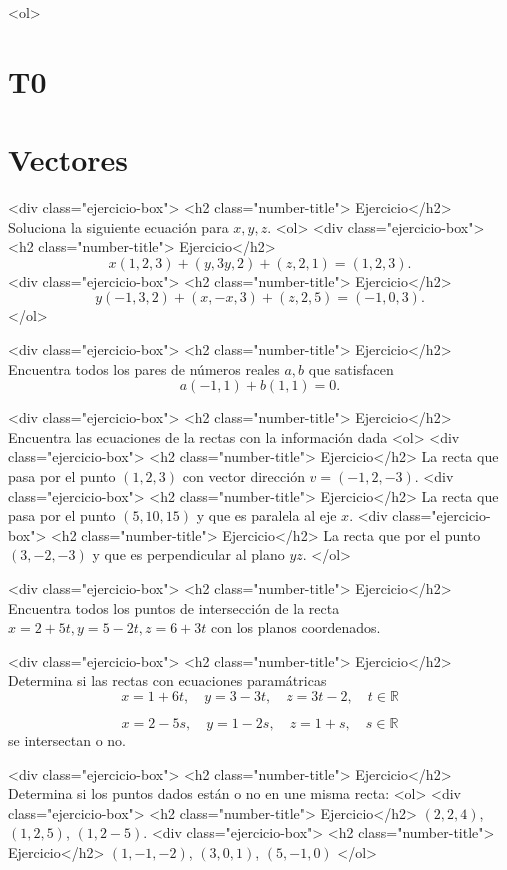 \documentclass{article}
\theoremstyle{definition}
\begin{document}
<ol>


  \section*{T0}

\section*{Vectores}


    
 <div class="ejercicio-box"> <h2 class="number-title"> Ejercicio</h2> Soluciona la siguiente ecuación para $x,y,z$.
    <ol>
    <div class="ejercicio-box"> <h2 class="number-title"> Ejercicio</h2>
      $$
      x(1,2,3)+(y,3y,2)+(z,2,1)=(1,2,3).
     $$
    <div class="ejercicio-box"> <h2 class="number-title"> Ejercicio</h2>
      $$
     y(-1,3,2)+(x,-x,3)+(z,2,5)=(-1,0,3).
      $$
    </ol>

  <div class="ejercicio-box"> <h2 class="number-title"> Ejercicio</h2> Encuentra todos los pares de números reales $a,b$ que satisfacen
    $$
    a(-1,1)+b(1,1)=0.
    $$



  <div class="ejercicio-box"> <h2 class="number-title"> Ejercicio</h2> Encuentra las ecuaciones de la rectas con la información dada
    <ol>
    <div class="ejercicio-box"> <h2 class="number-title"> Ejercicio</h2> La recta que pasa por el punto $(1,2,3)$ con vector dirección $v=(-1,2,-3)$.
    <div class="ejercicio-box"> <h2 class="number-title"> Ejercicio</h2> La recta que pasa por el punto $(5,10,15)$ y que es paralela al eje $x$.
      <div class="ejercicio-box"> <h2 class="number-title"> Ejercicio</h2> La recta que por el punto $(3,-2,-3)$ y que es perpendicular al plano $yz$.
    </ol>
    
    <div class="ejercicio-box"> <h2 class="number-title"> Ejercicio</h2> Encuentra todos los puntos de intersección de la recta $x=2+5t,y=5-2t,z=6+3t$ con los planos coordenados.

      
    <div class="ejercicio-box"> <h2 class="number-title"> Ejercicio</h2> Determina si las rectas con ecuaciones paramátricas
      $$
      x=1+6t, \quad y=3-3t, \quad z=3t-2, \quad t\in \mathbb{R}
      $$
      
      $$
      x=2-5s, \quad y=1-2s,\quad z=1+s, \quad s \in \mathbb{R}
      $$
      se intersectan o no.
 

    <div class="ejercicio-box"> <h2 class="number-title"> Ejercicio</h2> Determina si los puntos dados están  o no en une misma recta:
      <ol>
      <div class="ejercicio-box"> <h2 class="number-title"> Ejercicio</h2> $(2,2,4)$, $(1,2,5)$, $(1,2-5)$.
      <div class="ejercicio-box"> <h2 class="number-title"> Ejercicio</h2> $(1,-1,-2)$, $(3,0,1)$, $(5,-1,0)$
      </ol>
          
\end{document}
